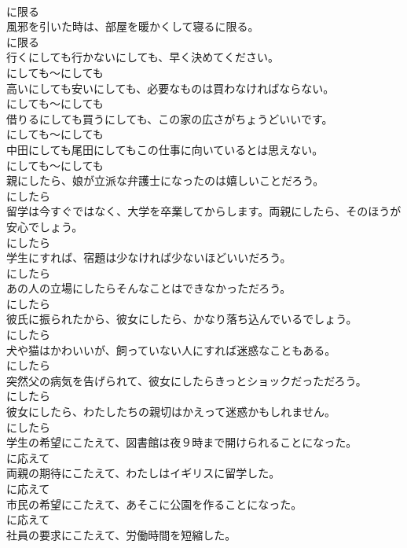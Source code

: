 \documentclass[8pt]{extreport}
\begin{document}
\begin{CJK}{UTF8}{min}
\\	に限る
\\	風邪を引いた時は、部屋を暖かくして寝るに限る。	
\\	に限る
\\	行くにしても行かないにしても、早く決めてください。	
\\	にしても～にしても
\\	高いにしても安いにしても、必要なものは買わなければならない。	
\\	にしても～にしても
\\	借りるにしても買うにしても、この家の広さがちょうどいいです。	
\\	にしても～にしても
\\	中田にしても尾田にしてもこの仕事に向いているとは思えない。	
\\	にしても～にしても
\\	親にしたら、娘が立派な弁護士になったのは嬉しいことだろう。	
\\	にしたら
\\	留学は今すぐではなく、大学を卒業してからします。両親にしたら、そのほうが安心でしょう。	
\\	にしたら
\\	学生にすれば、宿題は少なければ少ないほどいいだろう。	
\\	にしたら
\\	あの人の立場にしたらそんなことはできなかっただろう。	
\\	にしたら
\\	彼氏に振られたから、彼女にしたら、かなり落ち込んでいるでしょう。	
\\	にしたら
\\	犬や猫はかわいいが、飼っていない人にすれば迷惑なこともある。	
\\	にしたら
\\	突然父の病気を告げられて、彼女にしたらきっとショックだっただろう。	
\\	にしたら
\\	彼女にしたら、わたしたちの親切はかえって迷惑かもしれません。	
\\	にしたら
\\	学生の希望にこたえて、図書館は夜９時まで開けられることになった。	
\\	に応えて
\\	両親の期待にこたえて、わたしはイギリスに留学した。	
\\	に応えて
\\	市民の希望にこたえて、あそこに公園を作ることになった。	
\\	に応えて
\\	社員の要求にこたえて、労働時間を短縮した。	

\end{CJK}
\end{document}
